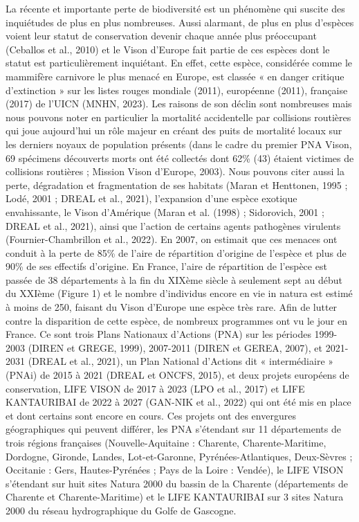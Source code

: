 \documentclass[
  letterpaper,
  DIV=11,
  numbers=noendperiod]{scrreprt}
\begin{document}
La récente et importante perte de biodiversité est un phénomène qui
suscite des inquiétudes de plus en plus nombreuses. Aussi alarmant, de
plus en plus d'espèces voient leur statut de conservation devenir chaque
année plus préoccupant (Ceballos et al., 2010) et le Vison d'Europe fait
partie de ces espèces dont le statut est particulièrement inquiétant. En
effet, cette espèce, considérée comme le mammifère carnivore le plus
menacé en Europe, est classée « en danger critique d'extinction » sur
les listes rouges mondiale (2011), européenne (2011), française (2017)
de l'UICN (MNHN, 2023). Les raisons de son déclin sont nombreuses mais
nous pouvons noter en particulier la mortalité accidentelle par
collisions routières qui joue aujourd'hui un rôle majeur en créant des
puits de mortalité locaux sur les derniers noyaux de population présents
(dans le cadre du premier PNA Vison, 69 spécimens découverts morts ont
été collectés dont 62\% (43) étaient victimes de collisions routières ;
Mission Vison d'Europe, 2003). Nous pouvons citer aussi la perte,
dégradation et fragmentation de ses habitats (Maran et Henttonen, 1995 ;
Lodé, 2001 ; DREAL et al., 2021), l'expansion d'une espèce exotique
envahissante, le Vison d'Amérique (Maran et al. (1998) ; Sidorovich,
2001 ; DREAL et al., 2021), ainsi que l'action de certains agents
pathogènes virulents (Fournier-Chambrillon et al., 2022). En 2007, on
estimait que ces menaces ont conduit à la perte de 85\% de l'aire de
répartition d'origine de l'espèce et plus de 90\% de ses effectifs
d'origine. En France, l'aire de répartition de l'espèce est passée de 38
départements à la fin du XIXème siècle à seulement sept au début du
XXIème (Figure 1) et le nombre d'individus encore en vie in natura est
estimé à moins de 250, faisant du Vison d'Europe une espèce très rare.
Afin de lutter contre la disparition de cette espèce, de nombreux
programmes ont vu le jour en France. Ce sont trois Plans Nationaux
d'Actions (PNA) sur les périodes 1999-2003 (DIREN et GREGE, 1999),
2007-2011 (DIREN et GEREA, 2007), et 2021-2031 (DREAL et al., 2021), un
Plan National d'Actions dit « intermédiaire » (PNAi) de 2015 à 2021
(DREAL et ONCFS, 2015), et deux projets européens de conservation, LIFE
VISON de 2017 à 2023 (LPO et al., 2017) et LIFE KANTAURIBAI de 2022 à
2027 (GAN-NIK et al., 2022) qui ont été mis en place et dont certains
sont encore en cours. Ces projets ont des envergures géographiques qui
peuvent différer, les PNA s'étendant sur 11 départements de trois
régions françaises (Nouvelle-Aquitaine : Charente, Charente-Maritime,
Dordogne, Gironde, Landes, Lot-et-Garonne, Pyrénées-Atlantiques,
Deux-Sèvres ; Occitanie : Gers, Hautes-Pyrénées ; Pays de la Loire :
Vendée), le LIFE VISON s'étendant sur huit sites Natura 2000 du bassin
de la Charente (départements de Charente et Charente-Maritime) et le
LIFE KANTAURIBAI sur 3 sites Natura 2000 du réseau hydrographique du
Golfe de Gascogne.
\end{document}
